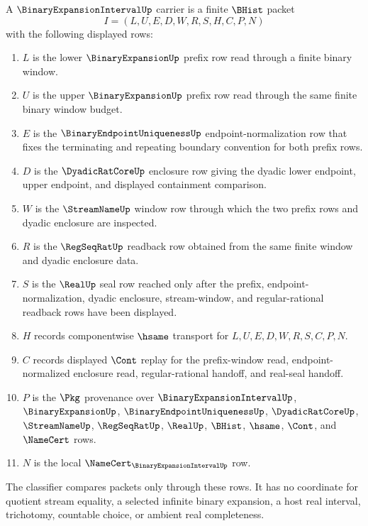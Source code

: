 \begin{definition}
\label{def:binary-expansion-interval-carrier}
A $\BinaryExpansionIntervalUp$ carrier is a finite $\BHist$ packet
$$
I=(L,U,E,D,W,R,S,H,C,P,N)
$$
with the following displayed rows:
\begin{enumerate}
\item $L$ is the lower $\BinaryExpansionUp$ prefix row read through a finite binary window.
\item $U$ is the upper $\BinaryExpansionUp$ prefix row read through the same finite binary window budget.
\item $E$ is the $\BinaryEndpointUniquenessUp$ endpoint-normalization row that fixes the terminating and repeating boundary convention for both prefix rows.
\item $D$ is the $\DyadicRatCoreUp$ enclosure row giving the dyadic lower endpoint, upper endpoint, and displayed containment comparison.
\item $W$ is the $\StreamNameUp$ window row through which the two prefix rows and dyadic enclosure are inspected.
\item $R$ is the $\RegSeqRatUp$ readback row obtained from the same finite window and dyadic enclosure data.
\item $S$ is the $\RealUp$ seal row reached only after the prefix, endpoint-normalization, dyadic enclosure, stream-window, and regular-rational readback rows have been displayed.
\item $H$ records componentwise $\hsame$ transport for $L,U,E,D,W,R,S,C,P,N$.
\item $C$ records displayed $\Cont$ replay for the prefix-window read, endpoint-normalized enclosure read, regular-rational handoff, and real-seal handoff.
\item $P$ is the $\Pkg$ provenance over $\BinaryExpansionIntervalUp$, $\BinaryExpansionUp$, $\BinaryEndpointUniquenessUp$, $\DyadicRatCoreUp$, $\StreamNameUp$, $\RegSeqRatUp$, $\RealUp$, $\BHist$, $\hsame$, $\Cont$, and $\NameCert$ rows.
\item $N$ is the local $\NameCert_{\BinaryExpansionIntervalUp}$ row.
\end{enumerate}
The classifier compares packets only through these rows. It has no coordinate for quotient stream equality, a selected infinite binary expansion, a host real interval, trichotomy, countable choice, or ambient real completeness.
\end{definition}

